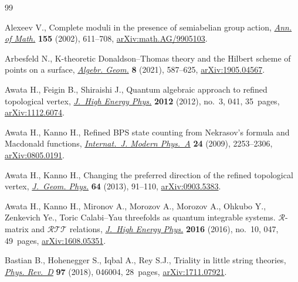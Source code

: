 \documentclass[10pt,a4paper]{amsart}
\numberwithin{equation}{section}
\begin{document}

\begin{thebibliography}{99}
\footnotesize\itemsep=0pt

Alexeev V., Complete moduli in the presence of semiabelian group action,
 \href{https://doi.org/10.2307/3062130}{\textit{Ann. of Math.}} \textbf{155} (2002), 611--708,
 \href{https://arxiv.org/abs/math.AG/9905103}{arXiv:math.AG/9905103}.

Arbesfeld N., K-theoretic {D}onaldson--{T}homas theory and the {H}ilbert scheme
 of points on a surface, \href{https://doi.org/10.14231/ag-2021-018}{\textit{Algebr. Geom.}} \textbf{8} (2021), 587--625,
 \href{https://arxiv.org/abs/1905.04567}{arXiv:1905.04567}.

Awata H., Feigin B., Shiraishi J., Quantum algebraic approach to refined
 topological vertex, \href{https://doi.org/10.1007/JHEP03(2012)041}{\textit{J.~High Energy Phys.}} \textbf{2012} (2012),
 no.~3, 041, 35~pages, \href{https://arxiv.org/abs/1112.6074}{arXiv:1112.6074}.

Awata H., Kanno H., Refined {BPS} state counting from {N}ekrasov's formula and
 {M}acdonald functions, \href{https://doi.org/10.1142/S0217751X09043006}{\textit{Internat.~J. Modern Phys.~A}} \textbf{24}
 (2009), 2253--2306, \href{https://arxiv.org/abs/0805.0191}{arXiv:0805.0191}.

Awata H., Kanno H., Changing the preferred direction of the refined topological
 vertex, \href{https://doi.org/10.1016/j.geomphys.2012.10.014}{\textit{J.~Geom. Phys.}} \textbf{64} (2013), 91--110,
 \href{https://arxiv.org/abs/0903.5383}{arXiv:0903.5383}.

Awata H., Kanno H., Mironov A., Morozov A., Morozov A., Ohkubo Y., Zenkevich
 {\relax Ye}., Toric {C}alabi--{Y}au threefolds as quantum integrable systems.
 {$\mathcal R$}-matrix and {$\mathcal{RTT}$} relations, \href{https://doi.org/10.1007/JHEP10(2016)047}{\textit{J.~High Energy
 Phys.}} \textbf{2016} (2016), no.~10, 047, 49~pages, \href{https://arxiv.org/abs/1608.05351}{arXiv:1608.05351}.

Bastian B., Hohenegger S., Iqbal A., Rey S.J., Triality in little string
 theories, \href{https://doi.org/10.1103/physrevd.97.046004}{\textit{Phys. Rev.~D}} \textbf{97} (2018), 046004, 28~pages,
 \href{https://arxiv.org/abs/1711.07921}{arXiv:1711.07921}.


\end{thebibliography}
\end{document}
